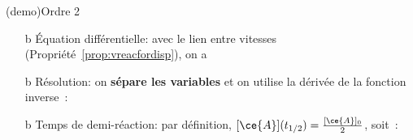 \documentclass[../../main/main.tex]{subfiles}
\begin{document}
\begin{tcb*}(demo){Ordre 2}
	\begin{enumerate}[start=3]
		\item[b]{Équation différentielle}:
		      avec le lien entre vitesses (Propriété~\ref{prop:vreacfordisp}), on a
		      \psw{%
			      \[
				      v = \frac{1}{-\abs{\nu_{\ce{A}}}} \dv{[\ce{A}]}{t}
				      \quad \ste{\Longleftrightarrow}{v = k[\ce{A}]^2} \quad
				      \boxed{\dv{[\ce{A}]}{t} = -\abs{\nu_{\ce{A}}} k [\ce{A}]^2}
			      \]
		      }%
		\item[b]{Résolution}:
		      on \textbf{sépare les variables} et on utilise la dérivée de la
		      fonction inverse~:
		\item[b]{Temps de demi-réaction}: par définition, $[\ce{A}](t_{1/2}) =
			      \frac{[\ce{A}]_0}{2}$, soit~:
	\end{enumerate}
\end{tcb*}
\end{document}
